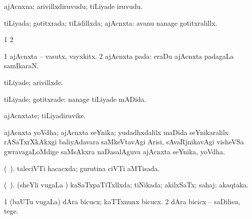 {{\bentry
{} 
\gl{\nA}
\expl{}
\bmng
ajAcnxna; arivillxdiruvudu; tiLiyade iruvudu. 
\emng
\eentry

\bentry
{} 
\gl{\gu}
\expl{}
\bmng
tiLiyada; gotitxrada; tiLidillxda; ajAcnxta:  avanu nanage gotitxralillx. 
\emng

\noindent
\gl{\pagu}
\expl{}
\bmng
\bnum
\num{1}  
\num{2}  
\enum
\emng
\eentry

\bentry
{} 
\gl{\nA}
\expl{}
\bmng
\bnum
\num{1} ajAcnxta -- vasutx, vayxkitx. 
\num{2} ajAcnxta pada:  eraDu ajAcnxta padagaLa samIkaraN. 
\enum
\emng
\eentry

\bentry
{} 
\gl{\kirxvi}
\expl{}
\bmng
tiLiyade; arivillxde. 
\emng

\noindent 
\gl{\pagu}
\expl{}
\bmng
{} tiLiyade; gotitxrade:  nanage tiLiyade mADida. 
\emng
\eentry

\bentry
{} 
\gl{\nA}
\expl{}
\bmng
ajAcnxtate; tiLiyadiruvike. 
\emng
\eentry

\bentry
{}
\gl{\nA}
\expl{}
\bmng
ajAcnxta yoVdha; ajAcnxta seYnika; yudadhxdalilx maDida seYnikaralilx rASaTxrXkAkxgi baliyAdavara saMkeVtavAgi Arisi, sAvaRjnikavAgi visheVSa gwravagaLoMdige saMsAkxra naDasalAguva ajAcnxta seYnika, yoVdha. 
\emng
\eentry

\bentry
{}
\gl{\nA}
\expl{}
\bmng
{} 
\emng
\eentry

\bentry
{} 
\gl{\gu}
\expl{}
\bmng
(\ame\ ). taleciVTi hacacxda; gurutina ciVTi aMTisada. 
\emng
\eentry

\bentry
{} 
\gl{\gu}
\expl{}
\bmng
(\ame\ ). (sheYli \mo vugaLa \vi) kaSaTxpaTiTxllxda; tiNikada; akilxSaTx; sahaj; akaqtaka. 
\emng
\eentry

\bentry
{} 
\gl{\sakirx}
\expl{}
\bmng
\bnum
\num{1} (baUTu \mo vugaLa) dAra bicucx; kaTTxnunx bicucx. 
\num{2} dAra bicicx -- saDilisu, tege. 
\enum
\emng
\eentry

}}
